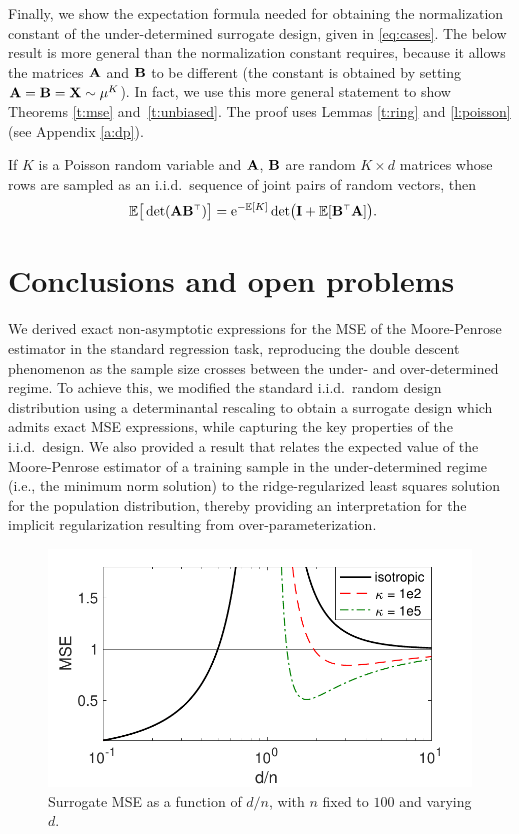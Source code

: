 \documentclass[11pt]{article}
\begin{document}
\noindent
Finally, we show the expectation formula needed for obtaining the
normalization constant of the under-determined surrogate design, given
in \eqref{eq:cases}.
The below result is more general than the normalization constant
requires, because it allows the matrices $\mathbf A$ and $\mathbf B$ to be different
(the constant is obtained by setting $\mathbf A=\mathbf B=\mathbf X\sim\mu^K$).
In fact, we use this more general statement to show Theorems
\ref{t:mse} and~\ref{t:unbiased}. The proof uses
Lemmas \ref{t:ring} and \ref{l:poisson} (see Appendix \ref{a:dp}).
\begin{lemma}\label{l:normalization}
If $K$ is a Poisson random variable and $\mathbf A$, $\mathbf B$ are random $K\times d$
matrices whose rows  are sampled as an i.i.d.~sequence of joint pairs of
random vectors, then
\begin{align*}
  \E\big[\det(\A\B^\top)\big] &= \ee^{-\E[K]}\det\!\big(\I + \E[\B^\top\A]\big).
  \end{align*}
\end{lemma}


\section{Conclusions and open problems}
\label{s:conclusions}

We derived exact non-asymptotic expressions for the MSE of the
Moore-Penrose estimator in the standard regression task, reproducing
the double descent phenomenon as the sample size crosses between the
under- and over-determined regime. To achieve this, we modified the
standard i.i.d.~random design distribution using a determinantal
rescaling to obtain a surrogate design which admits exact MSE expressions,
while capturing the key properties of the i.i.d.~design. We
also provided a result that relates the expected value of the
Moore-Penrose estimator of a training sample in the under-determined regime (i.e., the
minimum norm solution) to the ridge-regularized least squares solution
for the population distribution, thereby providing an interpretation for the
implicit regularization resulting from over-parameterization.

\begin{figure}
 \ifisarxiv\else \vspace{-.3cm}\fi
  \centering
 \includegraphics[width=.46\textwidth]{figs/descent-model-log}
\ifisarxiv\else \vspace{-2mm}\fi
  \caption{
Surrogate MSE as a function of $d/n$, with $n$
fixed to $100$ and varying $d$.}
  \label{f:model}
\ifisarxiv\else  \vspace{-.5cm}\fi
\end{figure}
\end{document}
